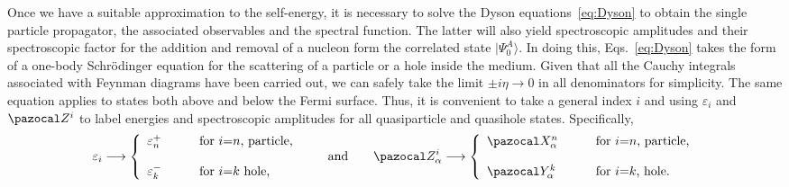  Once we have  a suitable approximation to the self-energy, it is necessary to solve the Dyson equations~\eqref{eq:Dyson}
 to obtain the single particle propagator, the  associated  observables and the  spectral function. The latter will also yield spectroscopic amplitudes and their spectroscopic factor for the addition and removal of a nucleon form the correlated state $|\Psi^A_0\rangle$.  In doing this, Eqs.~\eqref{eq:Dyson} takes the form of a one-body Schr\"odinger equation for the scattering of a particle or a hole inside the medium. Given that all the Cauchy integrals associated with Feynman diagrams have been carried out, we can safely take the limit $\pm i \eta \rightarrow 0$ in all denominators for simplicity. The same equation applies to states both above and below the Fermi surface.
 Thus, it is convenient to take a general index $i$ and using $\varepsilon_i$ and $\pazocal Z^i$ to label energies and spectroscopic amplitudes for all quasiparticle and quasihole states. Specifically,
 \begin{equation}
\varepsilon_i \longrightarrow \left\{
\begin{array}{lcl}
\varepsilon_n^+ & \quad & \hbox{for $i$=$n$, particle,}  \\ ~ \\
\varepsilon_k^- &  & \hbox{for $i$=$k$ hole,}
\end{array} \right.
\qquad \hbox{and} \qquad
\pazocal Z^i_\alpha  \longrightarrow \left\{
\begin{array}{lcl}
\pazocal X^n_\alpha & \quad & \hbox{for $i$=$n$, particle,} \\ ~ \\
\pazocal Y^k_\alpha &  & \hbox{for $i$=$k$, hole.}
\end{array} \right.
\label{eq:Z_ampl}
\end{equation}

